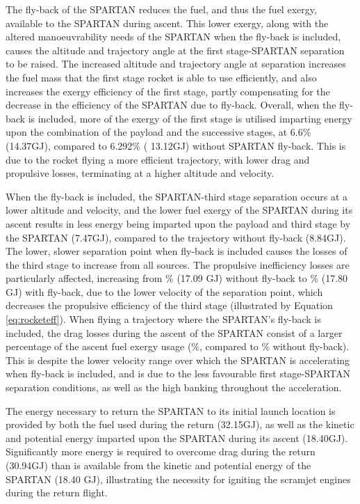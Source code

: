 The fly-back of the SPARTAN reduces the fuel, and thus the fuel exergy, available to the SPARTAN during ascent.
This lower exergy, along with the altered manoeuvrability needs of the SPARTAN when the fly-back is included, causes the altitude and trajectory angle at the first stage-SPARTAN separation to be raised. The increased altitude and trajectory angle at separation increases the fuel mass that the first stage rocket is able to use efficiently, and also increases the exergy efficiency of the first stage, partly compensating for the decrease in the efficiency of the SPARTAN due to fly-back. Overall, when the fly-back is included, more of the exergy of the first stage is utilised imparting energy upon the combination of the payload and the successive stages, at 6.6\% (14.37GJ), compared to 6.292\% ( 13.12GJ) without SPARTAN fly-back. This is due to the rocket flying a more efficient trajectory, with lower drag and propulsive losses, terminating at a higher altitude and velocity.

When the fly-back is included, the SPARTAN-third stage separation occurs at a lower altitude and velocity, and the lower fuel exergy of the SPARTAN during its ascent results in less energy being imparted upon the payload and third stage by the SPARTAN (7.47GJ), compared to the trajectory without fly-back (8.84GJ). 
The lower, slower separation point when fly-back is included causes the losses of the third stage to increase from all sources. The propulsive inefficiency losses are particularly affected, increasing from \PlossthreeCombinedStandardNoReturn \% (17.09 GJ) without fly-back to \PlossthreeCombinedStandard \% (17.80 GJ) with fly-back, due to the lower velocity of the separation point, which decreases the propulsive efficiency of the third stage (illustrated by Equation \ref{eq:rocketeff}).
When flying a trajectory where the SPARTAN's fly-back is included, the drag losses during the ascent of the SPARTAN consist of a larger percentage of the ascent fuel exergy usage  (\WDsecondStandard \%, compared to \WDsecondStandardNoReturn \% without fly-back). This is despite the lower velocity range over which the SPARTAN is accelerating when fly-back is included, and is due to the less favourable first stage-SPARTAN separation conditions, as well as the high banking throughout the acceleration. 


The energy necessary to return the SPARTAN to its initial launch location is provided by both the fuel used during the return (32.15GJ), as well as the kinetic and potential energy imparted upon the SPARTAN during its ascent (18.40GJ). Significantly more energy is required to overcome drag during the return (30.94GJ) than is available from the kinetic and potential energy of the SPARTAN (18.40 GJ), illustrating the necessity for igniting the scramjet engines during the return flight. 





